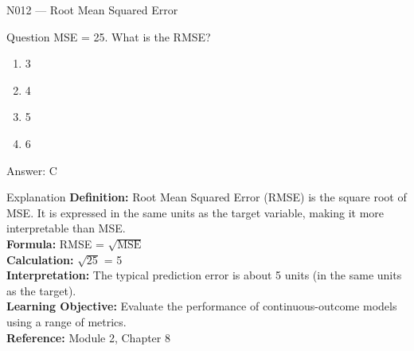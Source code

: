 \documentclass[aspectratio=169,8pt]{beamer}
\begin{document}
	\begin{frame}{N012 --- Root Mean Squared Error}
		\begin{block}{Question}
			MSE = 25. What is the RMSE?
			\begin{enumerate}
				\item 3
				\item 4
				\item 5
				\item 6
			\end{enumerate}
		\end{block}
		\begin{exampleblock}{Answer: C}\end{exampleblock}
		\begin{block}{Explanation}
			\textbf{Definition:} Root Mean Squared Error (RMSE) is the square root of MSE. It is expressed in the same units as the target variable, making it more interpretable than MSE.\\
			\textbf{Formula:} RMSE = $\sqrt{\text{MSE}}$\\
			\textbf{Calculation:} $\sqrt{25}$ = 5\\
			\textbf{Interpretation:} The typical prediction error is about 5 units (in the same units as the target).\\
			\textbf{Learning Objective:} Evaluate the performance of continuous-outcome models using a range of metrics.\\
			\textbf{Reference:} Module 2, Chapter 8
		\end{block}
	\end{frame}
	
\end{document}
